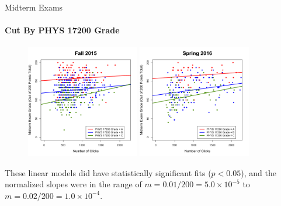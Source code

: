 \documentclass[xcolor=x11names,compress]{beamer}
\begin{document}
\begin{frame}{Midterm Exams}
	\framesubtitle{Cut By PHYS 17200 Grade}
	\begin{figure}
		\includegraphics[width=0.44\textwidth]{img/exam_fa15_172.pdf}
		\includegraphics[width=0.44\textwidth]{img/exam_sp16_172.pdf}
	\end{figure}
	These linear models did have statistically significant fits ($ p < 0.05$), and the normalized slopes were in the range of $m = 0.01 / 200 = 5.0 \times 10^{-5}$ to $m = 0.02 / 200 = 1.0 \times 10^{-4}$.
\end{frame}
\end{document}
